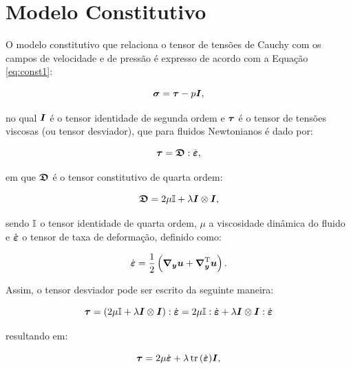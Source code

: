 \section{Modelo Constitutivo} \label{MC}

O modelo constitutivo que relaciona o tensor de tensões de Cauchy com os campos de velocidade e de pressão é expresso de acordo com a Equação \eqref{eq:const1}:

\begin{equation}
    \boldsymbol{\sigma}=\boldsymbol{\tau}-p\boldsymbol{I}\text{,}\label{eq:const1}
\end{equation}

\noindent no qual $\boldsymbol{I}$ é o tensor identidade de segunda ordem e $\boldsymbol{\tau}$ é o tensor de tensões viscosas (ou tensor desviador), que para fluidos Newtonianos é dado por:

\begin{equation}
    \boldsymbol{\tau}=\boldsymbol{\mathfrak{D}}:\dot{\boldsymbol{\varepsilon}}\text{,}
\end{equation}

\noindent em que $\boldsymbol{\mathfrak{D}}$ é o tensor constitutivo de quarta ordem:

\begin{equation}
    \boldsymbol{\mathfrak{D}}=2\mu\boldsymbol{\mathbb{I}}+\lambda\boldsymbol{I}\otimes\boldsymbol{I}\text{,}
\end{equation}

\noindent sendo $\boldsymbol{\mathbb{I}}$ o tensor identidade de quarta ordem, $\mu$ a viscosidade dinâmica do fluido e $\dot{\boldsymbol{\varepsilon}}$ o tensor de taxa de deformação, definido como:

\begin{equation}
    \dot{\boldsymbol{\varepsilon}}=\frac{1}{2}\left({\boldsymbol{\nabla_y}\boldsymbol{u}+\boldsymbol{\nabla}^{\mathrm{T}}_{\boldsymbol{y}}\boldsymbol{u}}\right)\text{.}\label{eq:deftax1}
\end{equation}

Assim, o tensor desviador pode ser escrito da seguinte maneira:

\[
    \boldsymbol{\tau}=(2\mu\boldsymbol{\mathbb{I}}+\lambda\boldsymbol{I}\otimes\boldsymbol{I}):\dot{\boldsymbol{\varepsilon}}=2\mu\boldsymbol{\mathbb{I}}:\dot{\boldsymbol{\varepsilon}}+\lambda\boldsymbol{I}\otimes\boldsymbol{I}:\dot{\boldsymbol{\varepsilon}}
\]

\noindent resultando em:

\begin{equation}
    \boldsymbol{\tau}=2\mu\dot{\boldsymbol{\varepsilon}}+\lambda\mathop{\mathrm{tr}}\nolimits{(\dot{\boldsymbol{\varepsilon}})}\boldsymbol{I}\text{,}
\end{equation}

